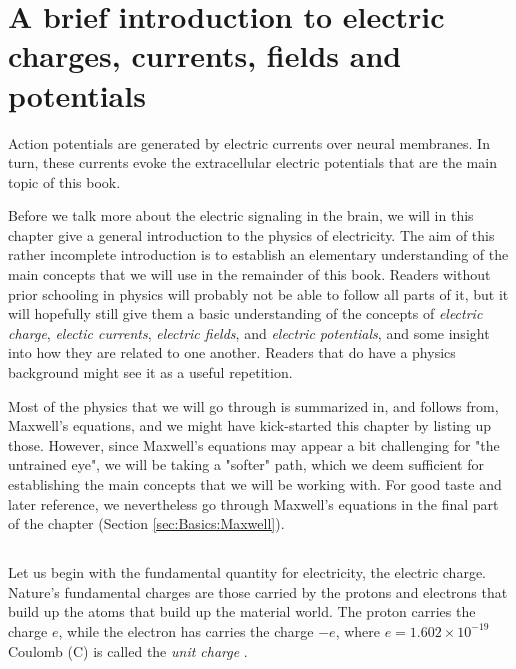 \chapter{A brief introduction to electric charges, currents, fields and potentials} 
\label{sec:Basics}
Action potentials are generated by electric currents over neural membranes. In turn, these currents
evoke the extracellular electric potentials that are the main topic of this book. 

Before we talk more about the electric signaling in the brain, we will in this chapter give a general introduction to the physics of electricity. The aim of this rather incomplete introduction is to establish an elementary understanding of the main concepts that we will use in the remainder of this book. Readers without prior schooling in physics will probably not be able to follow all parts of it, but it will hopefully still give them a basic understanding of the concepts of \textit{electric charge}, \textit{electic currents}, \textit{electric fields}, and \textit{electric potentials}, and some insight into how they are related to one another. Readers that do have a physics background might see it as a useful repetition. 

Most of the physics that we will go through is summarized in, and follows from, Maxwell's equations, and we might have kick-started this chapter by listing up those. However, since Maxwell's equations may appear a bit challenging for "the untrained eye", we will be taking a "softer" path, which we deem sufficient for establishing the main concepts that we will be working with. For good taste and later reference, we nevertheless go through Maxwell's equations in the final part of the chapter (Section \ref{sec:Basics:Maxwell}).


\section{}
\label{sec:Basics:Charge} 
Let us begin with the fundamental quantity for electricity, the electric charge. Nature's fundamental charges are those carried by the protons and electrons that build up the atoms that build up the material world. The proton carries the charge $e$, while the electron has carries the charge $-e$, where $e = 1.602\times10^{-19}$ Coulomb (C) is called the \textit{unit charge} . 

